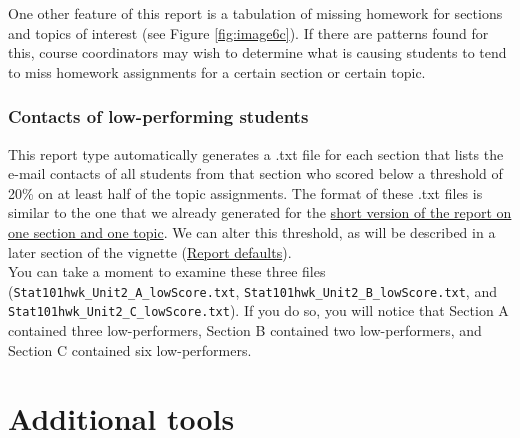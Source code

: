 \documentclass{article}\usepackage[]{graphicx}\usepackage[]{color}
\numberwithin{equation}{section} %
\begin{document}
One other feature of this report is a tabulation of missing homework for sections and topics of interest (see Figure \ref{fig:image6c}). If there are patterns found for this, course coordinators may wish to determine what is causing students to tend to miss homework assignments for a certain section or certain topic.

\begin{center}
\captionsetup{width=0.7\textwidth}
\label{fig:image6c}
\end{center}

\subsubsection{Contacts of low-performing students}
\label{sec:lowPer}

This report type automatically generates a .txt file for each section that lists the e-mail contacts of all students from that section who scored below a threshold of 20\% on at least half of the topic assignments. The format of these .txt files is similar to the one that we already generated for the \hyperref[sec:lowPerform]{short version of the report on one section and one topic}. We can alter this threshold, as will be described in a later section of the vignette (\hyperref[sec:repOptions]{Report defaults}). \\

You can take a moment to examine these three files (\texttt{Stat101hwk\_Unit2\_A\_lowScore.txt}, \texttt{Stat101hwk\_Unit2\_B\_lowScore.txt}, and \texttt{Stat101hwk\_Unit2\_C\_lowScore.txt}). If you do so, you will notice that Section A contained three low-performers, Section B contained two low-performers, and Section C contained six low-performers.\\

\section{Additional tools}
\end{document}
